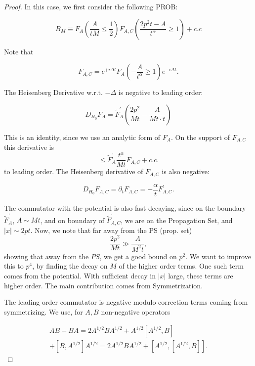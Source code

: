 \documentclass[11pt]{article}
\begin{document}
\begin{proof}
In this case, we first consider the following PROB:

\begin{equation*}
B_{M} \equiv F_{A}\left(\frac{A}{tM} \leq \frac{1}{2}\right) F_{A, C} \left( \frac{2 p^{2} t-A}{t^{\alpha}} \geqslant 1\right)+c . c \tag{B.1}
\end{equation*}


Note that

\begin{equation}
F_{A, C}=e^{+i \Delta t} F_{A}\left(-\frac{A}{t^{\alpha}} \geqslant 1\right) e^{-i \Delta t} . \tag{B.2}
\end{equation}


The Heisenberg Derivative w.r.t. $-\Delta$ is negative to leading order:

\begin{equation*}
D_{H_{0}} F_{A}=\tilde{F}_{A}^{\prime}\left(\frac{2 p^{2}}{Mt}-\frac{A}{Mt \cdot t}\right) \tag{B.3}
\end{equation*}


This is an identity, since we use an analytic form of $F_{A}$.
On the support of $F_{A, C}$ this derivative is
$$
\leqslant \tilde{F}_{A}^{\prime} \frac{t^{\alpha}}{M t} F_{A,C}+ c . c .
$$
to leading order.
The Heisenberg derivative of $F_{A, C}$ is also negative:

\begin{equation*}
D_{H_{0}} F_{A, C}=\partial_{t} F_{A,C}=-\frac{\alpha}{t} F_{A,C}^{\prime} . \tag{B.4}
\end{equation*}


The commutator with the potential is also fast decaying, since on the boundary $\tilde{F}_{A}^{\prime}$, $A \sim M t$, and on boundary of $\tilde{F}_{A, C}^{\prime}$, we are on the Propagation Set, and $|x| \sim 2 p t.$
Now, we note that far away from the PS (prop.  set)
$$
\frac{2 p^{2}}{Mt } \gg \frac{A}{M^2t},
$$
showing that away from the $P S$, we get a good bound on $p^{2}$.
We want to improve this to $p^{4}$, by finding the decay on $M$ of the higher order terms. One such term comes from the potential. With sufficient decay in $|x|$ large, these terms are higher order.
The main contribution comes from Symmetrization.

The leading order commutator is negative modulo correction terms coming from symmetrizing.
We use, for $A, B$ non-negative operators

\begin{align*}
A B+B A=2 A^{1 / 2} B A^{1 / 2}+A^{1 / 2}\left[A^{1 / 2}, B\right] \\
+\left[B, A^{1 / 2}\right] A^{1 / 2}=2 A^{1 / 2} B A^{1 / 2}+\left[A^{1 / 2},\left[A^{1 / 2}, B\right]\right] . \tag{B.5}
\end{align*}



\end{proof}
\end{document}
